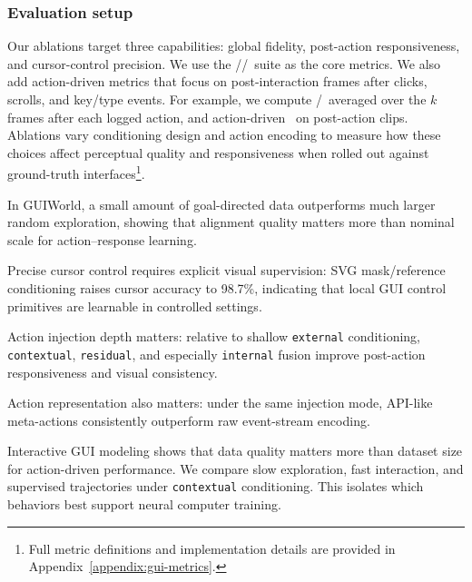 \subsubsection{Evaluation setup}
Our ablations target three capabilities: global fidelity, post-action responsiveness, and cursor-control precision.
We use the \FVD/\LPIPS/\SSIM~suite as the core metrics.
We also add action-driven metrics that focus on post-interaction frames after clicks, scrolls, and key/type events.
For example, we compute \SSIM/\LPIPS~averaged over the $k$ frames after each logged action, and action-driven \FVD~on post-action clips.
Ablations vary conditioning design and action encoding to measure how these choices affect perceptual quality and responsiveness when rolled out against ground-truth interfaces\footnote{Full metric definitions and implementation details are provided in Appendix~\ref{appendix:gui-metrics}.}.

\begin{tcolorbox}[
  colback=apricotglaze!40!white,
  colframe=metablue!40,
  interior style={shade,shading angle=315,left color=white,right color=apricotglaze!55!white},
  boxrule=0pt,
  borderline west={1pt}{0pt}{gray!60},
  left=6pt,right=4pt,top=3pt,bottom=3pt]
\small
\begin{badgeitems}
  \item In GUIWorld, a small amount of goal-directed data outperforms much larger random exploration, showing that alignment quality matters more than nominal scale for action--response learning.
  \item Precise cursor control requires explicit visual supervision: SVG mask/reference conditioning raises cursor accuracy to 98.7\%, indicating that local GUI control primitives are learnable in controlled settings.
  \item Action injection depth matters: relative to shallow \texttt{external} conditioning, \texttt{contextual}, \texttt{residual}, and especially \texttt{internal} fusion improve post-action responsiveness and visual consistency.
  \item Action representation also matters: under the same injection mode, API-like meta-actions consistently outperform raw event-stream encoding.
\end{badgeitems}
\end{tcolorbox}


Interactive GUI modeling shows that data quality matters more than dataset size for action-driven performance.
We compare slow exploration, fast interaction, and supervised trajectories under \texttt{contextual} conditioning.
This isolates which behaviors best support neural computer training.

